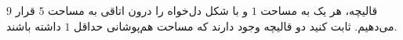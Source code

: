 \EXERCISE
$9$
قالیچه، هر یک به مساحت
$1$
و با شکل دل‌خواه را درون اتاقی به مساحت
$5$
قرار می‌دهیم. ثابت کنید دو قالیچه وجود دارند که مساحت هم‌پوشانی حداقل
$1$
داشته باشند.